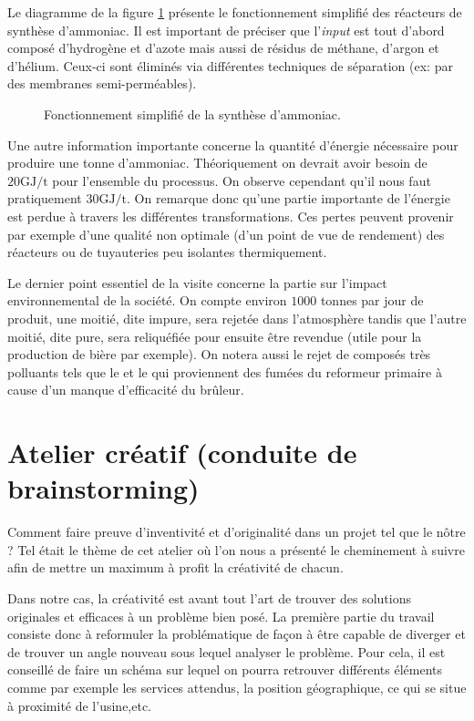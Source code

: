Le diagramme de la figure \ref{fig:synthese} présente le fonctionnement simplifié 
des réacteurs de synthèse d'ammoniac. Il est important de préciser que l'\emph{input}
est tout d'abord composé d'hydrogène et d'azote mais aussi de résidus de méthane, 
d'argon et d'hélium. Ceux-ci sont éliminés via différentes techniques 
de séparation (ex: par des membranes semi-perméables). 

\begin{figure}[h!]
	\begin{center}
		
	\end{center}
	\caption{Fonctionnement simplifié de la synthèse d'ammoniac.}
	\label{fig:synthese}
\end{figure}

Une autre information importante concerne la quantité d'énergie nécessaire pour produire
une tonne d'ammoniac. Théoriquement on devrait avoir besoin de $20 \si{\giga\joule/\tonne}$
pour l'ensemble du processus. On observe cependant qu'il nous faut 
pratiquement $30 \si{\giga\joule/\tonne}$. On remarque donc qu'une partie 
importante de l'énergie est perdue à travers les différentes transformations. 
Ces pertes peuvent provenir par exemple d'une qualité non optimale (d'un point de vue 
de rendement) des réacteurs ou de tuyauteries peu isolantes thermiquement.

Le dernier point essentiel de la visite concerne la partie sur l'impact environnemental 
de la société. On compte environ $1000$ tonnes par jour de  produit, une moitié,
dite impure, sera rejetée dans l'atmosphère tandis que l'autre moitié, dite pure, 
sera reliquéfiée pour ensuite être revendue (utile pour la production de bière par exemple).
On notera aussi le rejet de composés très polluants tels que le  et le  
qui proviennent des fumées du reformeur primaire à cause d'un manque d'efficacité
du brûleur.

\section{Atelier créatif (conduite de brainstorming)}

Comment faire preuve d'inventivité et d'originalité dans un projet tel que le nôtre ?
Tel était le thème de cet atelier où l'on nous a présenté le cheminement 
à suivre afin de mettre un maximum à profit la créativité de chacun.

Dans notre cas, la créativité est avant tout l'art de trouver des solutions 
originales et efficaces à un problème bien posé. 
La première partie du travail consiste donc à reformuler la problématique de façon 
à être capable de diverger et de trouver un angle nouveau sous lequel analyser le problème. 
Pour cela, il est conseillé de faire un schéma sur lequel on pourra retrouver différents
éléments comme par exemple les services attendus, la position géographique, 
ce qui se situe à proximité de l’usine,etc.

